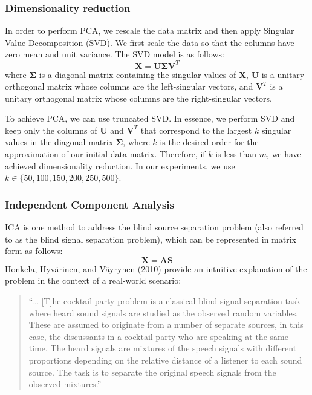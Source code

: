 \documentclass{article}
\begin{document}
\hypertarget{dimensionality-reduction}{%
\subsubsection{Dimensionality
reduction}\label{dimensionality-reduction}}

In order to perform PCA, we rescale the data matrix and then apply
Singular Value Decomposition (SVD). We first scale the data so that the
columns have zero mean and unit variance. The SVD model is as follows:
\[\mathbf{X = U \Sigma V}^T\] where \(\mathbf{\Sigma}\) is a diagonal
matrix containing the singular values of \(\mathbf{X}\), \(\mathbf{U}\)
is a unitary orthogonal matrix whose columns are the left-singular
vectors, and \(\mathbf{V}^T\) is a unitary orthogonal matrix whose
columns are the right-singular vectors.

To achieve PCA, we can use truncated SVD. In essence, we perform SVD and
keep only the columns of \(\mathbf{U}\) and \(\mathbf{V}^T\) that
correspond to the largest \(k\) singular values in the diagonal matrix
\(\mathbf{\Sigma}\), where \(k\) is the desired order for the
approximation of our initial data matrix. Therefore, if \(k\) is less
than \(m\), we have achieved dimensionality reduction. In our
experiments, we use \(k \in \{50, 100, 150, 200, 250, 500\}\).

\hypertarget{independent-component-analysis}{%
\subsubsection{Independent Component
Analysis}\label{independent-component-analysis}}

ICA is one method to address the blind source separation problem (also
referred to as the blind signal separation problem), which can be
represented in matrix form as follows: \[\mathbf{X = AS}\] Honkela,
Hyvärinen, and Väyrynen (2010) provide an intuitive explanation of the
problem in the context of a real-world scenario:

\begin{quote}
``\ldots{} {[}T{]}he cocktail party problem is a classical blind signal
separation task where heard sound signals are studied as the observed
random variables. These are assumed to originate from a number of
separate sources, in this case, the discussants in a cocktail party who
are speaking at the same time. The heard signals are mixtures of the
speech signals with different proportions depending on the relative
distance of a listener to each sound source. The task is to separate the
original speech signals from the observed mixtures.''
\end{quote}
\end{document}
